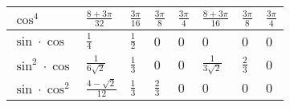 \begin{tabular}{p{1.3cm}|p{1cm}|p{0.55cm}|p{0.55cm}|p{0.55cm}|p{0.8cm}|p{0.55cm}|p{0.5cm}}
    $\cos^4$            & $\frac{8+3\pi}{32}$              & $\frac{3\pi}{16}$               & $\frac{3\pi}{8}$      & $\frac{3\pi}{4}$       & $\frac{8+3\pi}{16}$                             & $\frac{3\pi}{8}$                                & $\frac{3\pi}{4}$           \\ \hline %
    $\sin \cdot \cos$   & $\frac{1}{4}$                    & $\frac{1}{2}$                   & 0                     & 0                      & 0                                               & 0                                               & 0                          \\ \hline %
    $\sin^2 \cdot \cos$ & $\frac{1}{6\sqrt{2}}$            & $\frac{1}{3}$                   & 0                     & 0                      & $\frac{1}{3\sqrt{2}}$                           & $\frac{2}{3}$                                   & 0                          \\ \hline %
    $\sin \cdot \cos^2$ & $\frac{4-\sqrt{2}}{12}$          & $\frac{1}{3}$                   & $\frac{2}{3}$         & 0                      & 0                                               & 0                                               & 0                          \\ \hline %
\end{tabular}

\renewcommand{\arraystretch}{1}

